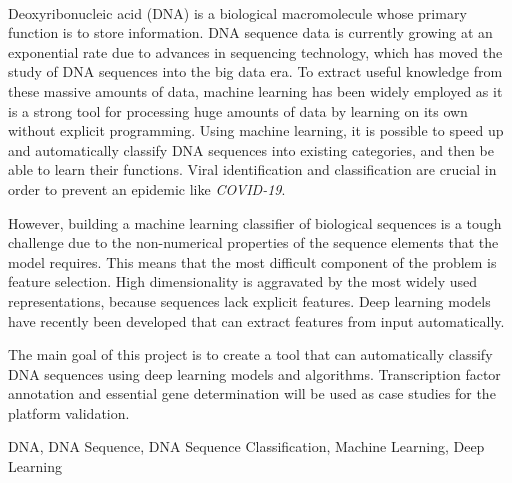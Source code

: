 {\large \textbf{\thetitle}}\\[1ex]
\noindent Deoxyribonucleic acid (DNA) is a biological macromolecule whose primary function is to store information. DNA sequence data is currently growing at an exponential rate due to advances in sequencing technology, which has moved the study of DNA sequences into the big data era. To extract useful knowledge from these massive amounts of data, machine learning has been widely employed as it is a strong tool for processing huge amounts of data by learning on its own without explicit programming. Using machine learning, it is possible to speed up and automatically classify DNA sequences into existing categories, and then be able to learn their functions. Viral identification and classification are crucial in order to prevent an epidemic like \emph{COVID-19}.

However, building a machine learning classifier of biological sequences is a tough challenge due to the non-numerical properties of the sequence elements that the model requires. This means that the most difficult component of the problem is feature selection. High dimensionality is aggravated by the most widely used representations, because sequences lack explicit features. Deep learning models have recently been developed that can extract features from input automatically.

The main goal of this project is to create a tool that can automatically classify DNA sequences using deep learning models and algorithms. Transcription factor annotation and essential gene determination will be used as case studies for the platform validation.

\begin{keywords}
DNA, DNA Sequence, DNA Sequence Classification, Machine Learning, Deep Learning
\end{keywords} 
